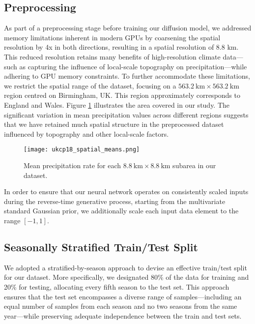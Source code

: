 \documentclass[ oneside,%
                    author={George Herbert},
                    degree={MSci},
                     title={Diffusion Models for Time-Evolving Precipitation Fields},
                  subtitle={}]{dissertation}
\begin{document}
\subsection{Preprocessing}

As part of a preprocessing stage before training our diffusion model, we addressed memory limitations inherent in modern GPUs by coarsening the spatial resolution by 4x in both directions, resulting in a spatial resolution of 8.8 km. This reduced resolution retains many benefits of high-resolution climate data---such as capturing the influence of local-scale topography on precipitation---while adhering to GPU memory constraints. To further accommodate these limitations, we restrict the spatial range of the dataset, focusing on a $563.2\ \mathrm{km}\times 563.2\ \mathrm{km}$ region centred on Birmingham, UK. This region approximately corresponds to England and Wales. Figure \ref{fig:ukcp18_spatial_means} illustrates the area covered in our study. The significant variation in mean precipitation values across different regions suggests that we have retained much spatial structure in the preprocessed dataset influenced by topography and other local-scale factors.

\begin{figure}[htbp]
      \centering
      \texttt{[image: ukcp18\_spatial\_means.png]}
      \caption{Mean precipitation rate for each $8.8\ \mathrm{km}\times 8.8\ \mathrm{km}$ subarea in our dataset.}
      \label{fig:ukcp18_spatial_means}
\end{figure}

In order to ensure that our neural network operates on consistently scaled inputs during the reverse-time generative process, starting from the multivariate standard Gaussian prior, we additionally scale each input data element to the range $[-1,1]$.

\subsection{Seasonally Stratified Train/Test Split}
\label{sec:results_dataset_train_test}

We adopted a stratified-by-season approach to devise an effective train/test split for our dataset. More specifically, we designated 80\% of the data for training and 20\% for testing, allocating every fifth season to the test set. This approach ensures that the test set encompasses a diverse range of samples---including an equal number of samples from each season and no two seasons from the same year---while preserving adequate independence between the train and test sets.
\end{document}
